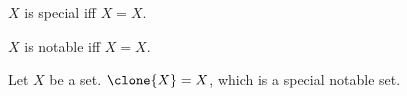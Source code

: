 \begin{definition}\label{html_special}
    $X$ is special iff $X=X$.
\end{definition}

\begin{definition}\label{html_notable}
    $X$ is notable iff $X=X$.
\end{definition}

\begin{definition}\label{html_clone}
    Let $X$ be a set.
    $\clone{X}=X$, which is a special notable set.
\end{definition}
